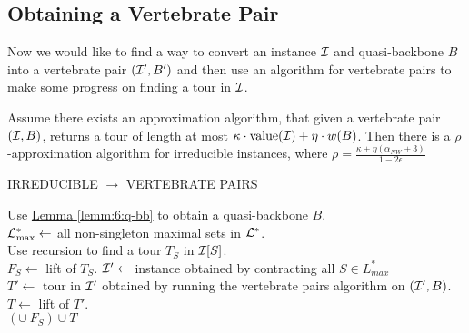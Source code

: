 \documentclass[./main.tex]{subfiles}
\begin{document}
	\subsection{Obtaining a Vertebrate Pair}
	Now we would like to find a way to convert an instance $\mathcal{I}$ and quasi-backbone $B$ into a vertebrate pair $(\mathcal{I}', B')$ and then use an algorithm for vertebrate pairs to make some progress on finding a tour in $\mathcal{I}$.\\
	\begin{theorem}
		Assume there exists an approximation algorithm, that given a vertebrate pair $(\mathcal{I}, B)$, returns a tour of length at most $\kappa\cdot\textup{value}(\mathcal{I}) + \eta\cdot w(B)$. Then there is a $\rho$-approximation algorithm for irreducible instances, where $\rho = \frac{\kappa + \eta(\alpha_{NW} + 3)}{1 - 2\epsilon}$
	\end{theorem}
	\begin{algorithm}\label{alg:6:irr-atsp}
		\caption{IRREDUCIBLE $\rightarrow$ VERTEBRATE PAIRS}
		Use \hyperref[lemm:6:q-bb]{Lemma \ref{lemm:6:q-bb}} to obtain a quasi-backbone $B$.\\
		$\mathcal{L}^*_{\max} \leftarrow $ all non-singleton maximal sets in $\mathcal{L}^*$.\\
		 {
		Use recursion to find a tour $T_S$ in $\mathcal{I}[S]$.\\
		$F_S\leftarrow$ lift of $T_S$.
		}
		$\mathcal{I}'\leftarrow$ instance obtained by contracting all $S\in L_{max}^*$\\
		$T'\leftarrow$ tour in $\mathcal{I}'$ obtained by running the vertebrate pairs algorithm on $(\mathcal{I}', B)$.\\
		$T \leftarrow $ lift of $T'$.\\
		\Return  $\left(\cup\ F_S\right)\cup T$
	\end{algorithm}
\end{document}
